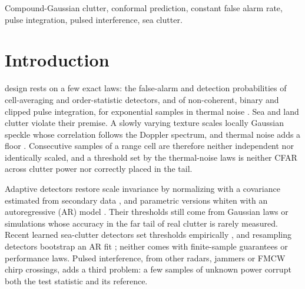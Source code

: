 \documentclass[journal]{IEEEtran}
\begin{document}
\begin{IEEEkeywords}
Compound-Gaussian clutter, conformal prediction, constant false alarm rate, pulse integration, pulsed interference, sea clutter.
\end{IEEEkeywords}

\section{Introduction}
 design rests on a few exact laws: the false-alarm and detection probabilities of cell-averaging and order-statistic detectors, and of non-coherent, binary and clipped pulse integration, for exponential samples in thermal noise \cite{finn1968,rohling1983,gandhi1988,richards2014,abbasi2018clip}. Sea and land clutter violate their premise. A slowly varying texture scales locally Gaussian speckle whose correlation follows the Doppler spectrum, and thermal noise adds a floor \cite{ward2013,conte1995,ollila2012}. Consecutive samples of a range cell are therefore neither independent nor identically scaled, and a threshold set by the thermal-noise laws is neither CFAR across clutter power nor correctly placed in the tail.

Adaptive detectors restore scale invariance by normalizing with a covariance estimated from secondary data \cite{kelly1986glrt,conte1995,kraut1999,pascal2008fp}, and parametric versions whiten with an autoregressive (AR) model \cite{roman2000,michels2000}. Their thresholds still come from Gaussian laws or simulations whose accuracy in the far tail of real clutter is rarely measured. Recent learned sea-clutter detectors set thresholds empirically \cite{bai2026cvae,rouzoumka2026ood,qu2023sensors}, and resampling detectors bootstrap an AR fit \cite{qu2024sieve,qu2026sact}; neither comes with finite-sample guarantees or performance laws. Pulsed interference, from other radars, jammers or FMCW chirp crossings, adds a third problem: a few samples of unknown power corrupt both the test statistic and its reference.
\end{document}
